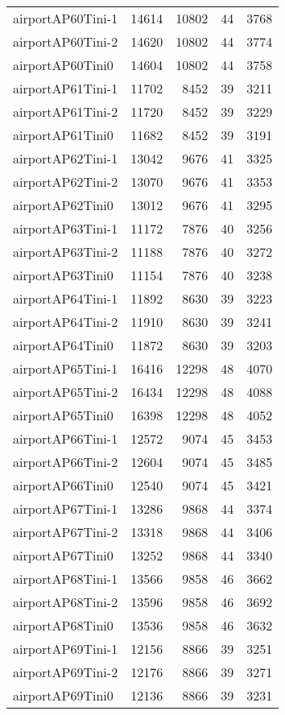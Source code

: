 \begin{longtable}{lrrrr}
airportAP60Tini-1 & 14614 & 10802 & 44 & 3768 \\
airportAP60Tini-2 & 14620 & 10802 & 44 & 3774 \\
airportAP60Tini0 & 14604 & 10802 & 44 & 3758 \\
airportAP61Tini-1 & 11702 & 8452 & 39 & 3211 \\
airportAP61Tini-2 & 11720 & 8452 & 39 & 3229 \\
airportAP61Tini0 & 11682 & 8452 & 39 & 3191 \\
airportAP62Tini-1 & 13042 & 9676 & 41 & 3325 \\
airportAP62Tini-2 & 13070 & 9676 & 41 & 3353 \\
airportAP62Tini0 & 13012 & 9676 & 41 & 3295 \\
airportAP63Tini-1 & 11172 & 7876 & 40 & 3256 \\
airportAP63Tini-2 & 11188 & 7876 & 40 & 3272 \\
airportAP63Tini0 & 11154 & 7876 & 40 & 3238 \\
airportAP64Tini-1 & 11892 & 8630 & 39 & 3223 \\
airportAP64Tini-2 & 11910 & 8630 & 39 & 3241 \\
airportAP64Tini0 & 11872 & 8630 & 39 & 3203 \\
airportAP65Tini-1 & 16416 & 12298 & 48 & 4070 \\
airportAP65Tini-2 & 16434 & 12298 & 48 & 4088 \\
airportAP65Tini0 & 16398 & 12298 & 48 & 4052 \\
airportAP66Tini-1 & 12572 & 9074 & 45 & 3453 \\
airportAP66Tini-2 & 12604 & 9074 & 45 & 3485 \\
airportAP66Tini0 & 12540 & 9074 & 45 & 3421 \\
airportAP67Tini-1 & 13286 & 9868 & 44 & 3374 \\
airportAP67Tini-2 & 13318 & 9868 & 44 & 3406 \\
airportAP67Tini0 & 13252 & 9868 & 44 & 3340 \\
airportAP68Tini-1 & 13566 & 9858 & 46 & 3662 \\
airportAP68Tini-2 & 13596 & 9858 & 46 & 3692 \\
airportAP68Tini0 & 13536 & 9858 & 46 & 3632 \\
airportAP69Tini-1 & 12156 & 8866 & 39 & 3251 \\
airportAP69Tini-2 & 12176 & 8866 & 39 & 3271 \\
airportAP69Tini0 & 12136 & 8866 & 39 & 3231 \\

\end{longtable}
